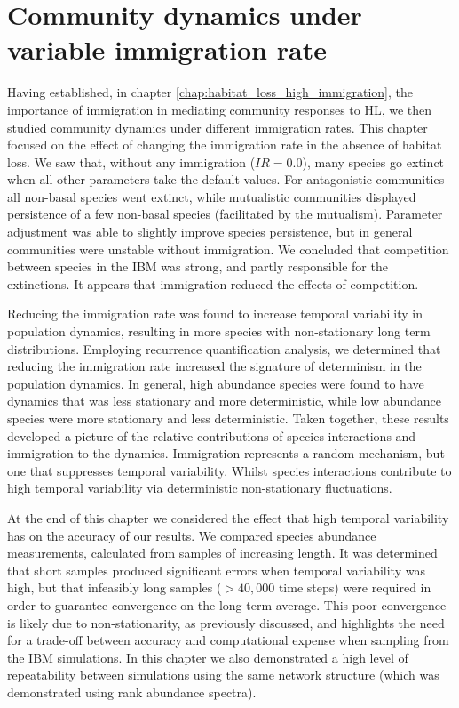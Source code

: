 \section{Community dynamics under variable immigration rate}
\label{sec:com_dyn_var}

Having established, in chapter \ref{chap:habitat_loss_high_immigration}, the importance of immigration in mediating community responses to HL, we then studied community dynamics under different immigration rates. This chapter focused on the effect of changing the immigration rate in the absence of habitat loss. We saw that, without any immigration ($IR=0.0$), many species go extinct when all other parameters take the default values. For antagonistic communities all non-basal species went extinct, while mutualistic communities displayed persistence of a few non-basal species (facilitated by the mutualism). Parameter adjustment was able to slightly improve species persistence, but in general communities were unstable without immigration. We concluded that competition between species in the IBM was strong, and partly responsible for the extinctions. It appears that immigration reduced the effects of competition.

Reducing the immigration rate was found to increase temporal variability in population dynamics, resulting in more species with non-stationary long term distributions. Employing recurrence quantification analysis, we determined that reducing the immigration rate increased the signature of determinism in the population dynamics. In general, high abundance species were found to have dynamics that was less stationary and more deterministic, while low abundance species were more stationary and less deterministic. Taken together, these results developed a picture of the relative contributions of species interactions and immigration to the dynamics. Immigration represents a random mechanism, but one that suppresses temporal variability. Whilst species interactions contribute to high temporal variability via deterministic non-stationary fluctuations. 

At the end of this chapter we considered the effect that high temporal variability has on the accuracy of our results. We compared species abundance measurements, calculated from samples of increasing length. It was determined that short samples produced significant errors when temporal variability was high, but that infeasibly long samples ($>40,000$ time steps) were required in order to guarantee convergence on the long term average. This poor convergence is likely due to non-stationarity, as previously discussed, and highlights the need for a trade-off between accuracy and computational expense when sampling from the IBM simulations. In this chapter we also demonstrated a high level of repeatability between simulations using the same network structure (which was demonstrated using rank abundance spectra). 

